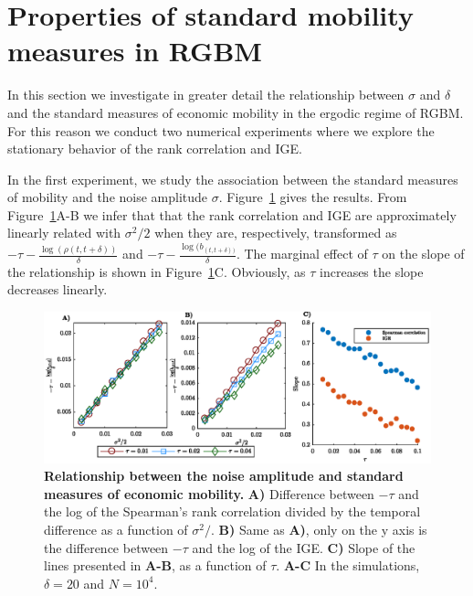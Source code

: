 \documentclass[11pt]{article}
\newcommand{\Fref}[1]{Figure~\ref{fig:#1}}
\numberwithin{equation}{section}
\begin{document}
\section{Properties of standard mobility measures in RGBM}\label{sec:properties-standard-mobility-measures}

In this section we investigate in greater detail the relationship between $\sigma$ and $\delta$ and the standard measures of economic mobility in the ergodic regime of RGBM. For this reason we conduct two numerical experiments where we explore the stationary behavior of the rank correlation and IGE. 

In the first experiment, we study the association between the standard measures of mobility and the noise amplitude $\sigma$. \Fref{rgbm-standard-measures-sigma} gives the results. From \Fref{rgbm-standard-measures-sigma}A-B we infer that that the rank correlation and IGE are approximately linearly related with $\sigma^2/2$ when they are, respectively, transformed as $-\tau - \frac{\log(\rho(t,t+\delta))}{\delta}$ and $-\tau - \frac{\log(b_{(t,t+\delta))}}{\delta}$. The marginal effect of $\tau$ on the slope of the relationship is shown in \Fref{rgbm-standard-measures-sigma}C. Obviously, as $\tau$ increases the slope decreases linearly.

\begin{figure}[!htb]
\centering
\includegraphics[width=1.0\textwidth]{figs/fig_rgbm_sigma_relationship.eps}
\caption{\textbf{Relationship between the noise amplitude and standard measures of economic mobility.} \textbf{A)} Difference between $-\tau$ and the log of the Spearman's rank correlation divided by the temporal difference as a function of $\sigma^2/$. \textbf{B)} Same as \textbf{A)}, only on the y axis is the difference between $-\tau$ and the log of the IGE. \textbf{C)} Slope of the lines presented in \textbf{A-B}, as a function of $\tau$. 
\textbf{A-C} In the simulations, $\delta = 20$ and $N = 10^4$.
\label{fig:rgbm-standard-measures-sigma}}
\end{figure}
\FloatBarrier
\end{document}
